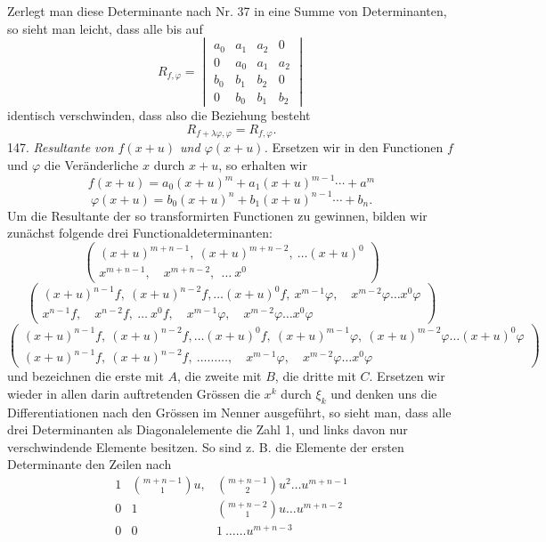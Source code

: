 Zerlegt man diese Determinante nach Nr. 37 in eine Summe von
Determinanten, so sieht man leicht, dass alle bis auf
\[
R_{f,\varphi} = \begin{vmatrix}
a_0 & a_1 & a_2 & 0\\
0 & a_0 & a_1 & a_2\\
b_0 & b_1 & b_2 & 0\\
0 & b_0 & b_1 & b_2
\end{vmatrix}
\]
identisch verschwinden, dass also die Beziehung besteht
\[
R_{f+\lambda\varphi,\varphi} = R_{f,\varphi}.
\]
147. \textit{Resultante von $f(x+u)$ und $\varphi(x+u)$.} Ersetzen wir
in den Functionen $f$ und $\varphi$ die Ver\"anderliche $x$ durch $x+u$,
so erhalten wir
\[
f(x+u) = a_0(x+u)^m + a_1(x+u)^{m-1}\cdots + a^m
\]
\[
\varphi(x+u) = b_0(x+u)^n + b_1(x+u)^{n-1}\cdots + b_n.
\]
Um die Resultante der so transformirten Functionen zu gewinnen, bilden
wir zun\"achst folgende drei Functionaldeterminanten:
\[
\left(\begin{array}{l}
(x+u)^{m+n-1},\ (x+u)^{m+n-2},\ \ldots (x+u)^0\\[2pt]
x^{m+n-1},\quad x^{m+n-2},\ \ \ldots\ x^0
\end{array}\right)
\]
\[
\left(\begin{array}{l}
(x+u)^{n-1}f,\ (x+u)^{n-2}f,\ldots(x+u)^0f,\ x^{m-1}\varphi,\quad x^{m-2}\varphi\ldots x^0\varphi\\[2pt]
x^{n-1}f,\quad x^{n-2}f,\ \ldots\ x^0f,\quad x^{m-1}\varphi,\quad x^{m-2}\varphi\ldots x^0\varphi
\end{array}\right)
\]
\[
\left(\begin{array}{l}
(x+u)^{n-1}f,\ (x+u)^{n-2}f,\ldots(x+u)^0f,\ (x+u)^{m-1}\varphi,\ (x+u)^{m-2}\varphi\ldots(x+u)^0\varphi\\[2pt]
(x+u)^{n-1}f,\ (x+u)^{n-2}f,\ \ldots\ldots\ldots,\quad x^{m-1}\varphi,\quad x^{m-2}\varphi\ldots x^0\varphi
\end{array}\right)
\]
und bezeichnen die erste mit $A$, die zweite mit $B$, die dritte mit
$C$. Ersetzen wir wieder in allen darin auftretenden Gr\"ossen die
$x^k$ durch $\xi_k$ und denken uns die Differentiationen nach den
Gr\"ossen im Nenner ausgef\"uhrt, so sieht man, dass alle drei
Determinanten als Diagonalelemente die Zahl 1, und links davon nur
verschwindende Elemente besitzen. So sind z. B. die Elemente der ersten
Determinante den Zeilen nach
\[
\begin{array}{lll}
1 & \binom{m+n-1}{1}u, & \binom{m+n-1}{2}u^2\ldots u^{m+n-1}\\
0 & 1 & \binom{m+n-2}{1}u\ldots u^{m+n-2}\\
0 & 0 & 1\ \ldots\ldots u^{m+n-3}
\end{array}
\]
